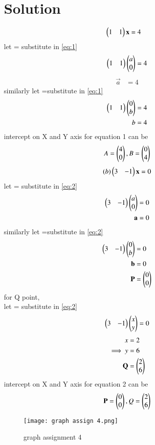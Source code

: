\documentclass[journal,12pt,twocolumn]{IEEEtran}
\begin{document}
\section{Solution}
\begin{align}\label{eq:1}
 \begin{pmatrix}1&1\end{pmatrix}\mathbf{x}&=4
 \end{align}
let = substitute in \eqref{eq:1}
\begin{align}
  \begin{pmatrix}1&1\end{pmatrix}\begin{pmatrix}a\\0\end{pmatrix}=4  
\end{align}
\begin{align}
\vec{a}&=4
\end{align}
similarly let =substitute in \eqref{eq:1}
\begin{align}
\begin{pmatrix}1&1\end{pmatrix}\begin{pmatrix}0\\b\end{pmatrix}&=4\\
b&=4
\end{align}
intercept on X and Y axis for equation 1 can be
$$A=\begin{pmatrix}4\\0\end{pmatrix}, B=\begin{pmatrix}0\\4\end{pmatrix}$$
\begin{align}\label{eq:2}
(b)\begin{pmatrix}3&-1\end{pmatrix}\mathbf{x}=0
\end{align}
let = substitute in \eqref{eq:2}
\begin{align}
\begin{pmatrix}3&-1\end{pmatrix}\begin{pmatrix}a\\0\end{pmatrix}&=0\\
    \mathbf{a}&=0
\end{align}
similarly let =substitute in \eqref{eq:2}
\begin{align}
\begin{pmatrix}3&-1\end{pmatrix}\begin{pmatrix}0\\b\end{pmatrix}&=0\\
\mathbf{b}&=0\\
\mathbf{P}&=\begin{pmatrix}0\\0\end{pmatrix}
\end{align}
for Q point,\\
let = substitute in \eqref{eq:2}  
\begin{equation} \label{eq1}
\begin{pmatrix}3&-1\end{pmatrix}\begin{pmatrix}x\\y\end{pmatrix}=0
\end{equation}
\begin{align}
{x}&=2\\
\implies {y}&=6\\
\mathbf{Q}&=\begin{pmatrix}2\\6\end{pmatrix}
\end{align}
intercept on X and Y axis for equation 2 can be
$$\mathbf{P}=\begin{pmatrix}0\\0\end{pmatrix}, Q=\begin{pmatrix}2\\6\end{pmatrix}$$
\begin{figure}[h]
    \centering
    \texttt{[image: graph assign 4.png]}
    \caption{graph assignment 4}
    \label{graph assign 4.png}
\end{figure}
\end{document}
